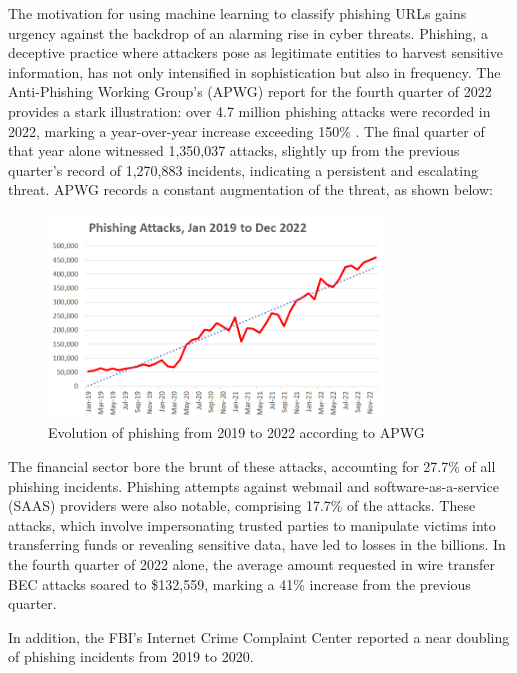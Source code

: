 \documentclass{article}
\begin{document}
    The motivation for using machine learning to classify phishing URLs gains urgency against the backdrop of an alarming rise in cyber threats.
    Phishing, a deceptive practice where attackers pose as legitimate entities to harvest sensitive information, has not only intensified in sophistication but also in frequency.
    The Anti-Phishing Working Group's (APWG) report for the fourth quarter of 2022 provides a stark illustration: over 4.7 million phishing attacks were recorded in 2022, marking a year-over-year increase exceeding 150\% \cite{PhishingActivityTrendsReport}.
    The final quarter of that year alone witnessed 1,350,037 attacks, slightly up from the previous quarter's record of 1,270,883 incidents, indicating a persistent and escalating threat.
    APWG records a constant augmentation of the threat, as shown below:

    \begin{figure}
        \centering
        \includegraphics[width=0.8\textwidth]{report_img/shartincreasingphishing}
        \caption{Evolution of phishing from 2019 to 2022 according to APWG\cite{PhishingActivityTrendsReport}}
        \label{fig:figure}
    \end{figure}

    The financial sector bore the brunt of these attacks, accounting for 27.7\% of all phishing incidents.
    Phishing attempts against webmail and software-as-a-service (SAAS) providers were also notable, comprising 17.7\% of the attacks.
    These attacks, which involve impersonating trusted parties to manipulate victims into transferring funds or revealing sensitive data, have led to losses in the billions.
    In the fourth quarter of 2022 alone, the average amount requested in wire transfer BEC attacks soared to \$132,559, marking a 41\% increase from the previous quarter.

    In addition, the FBI’s Internet Crime Complaint Center reported a near doubling of phishing incidents from 2019 to 2020.
\end{document}
